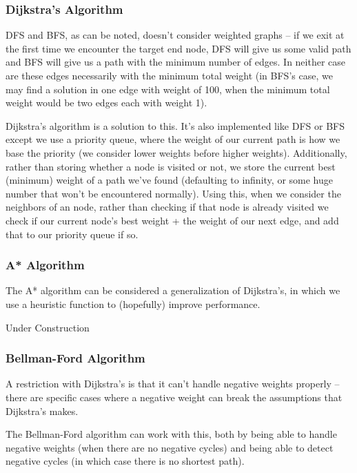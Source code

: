 \subsubsection{Dijkstra's Algorithm}

DFS and BFS, as can be noted, doesn't consider weighted graphs -- if we exit at the first time we encounter the target end node, DFS will give us some valid path and BFS will give us a path with the minimum number of edges. In neither case are these edges necessarily with the minimum total weight (in BFS's case, we may find a solution in one edge with weight of 100, when the minimum total weight would be two edges each with weight 1).

Dijkstra's algorithm is a solution to this. It's also implemented like DFS or BFS except we use a priority queue, where the weight of our current path is how we base the priority (we consider lower weights before higher weights). Additionally, rather than storing whether a node is visited or not, we store the current best (minimum) weight of a path we've found (defaulting to infinity, or some huge number that won't be encountered normally). Using this, when we consider the neighbors of an node, rather than checking if that node is already visited we check if our current node's best weight + the weight of our next edge, and add that to our priority queue if so.

\subsubsection{A* Algorithm}

The A* algorithm can be considered a generalization of Dijkstra's, in which we use a heuristic function to (hopefully) improve performance.

Under Construction

\subsubsection{Bellman-Ford Algorithm}

A restriction with Dijkstra's is that it can't handle negative weights properly -- there are specific cases where a negative weight can break the assumptions that Dijkstra's makes.

The Bellman-Ford algorithm can work with this, both by being able to handle negative weights (when there are no negative cycles) and being able to detect negative cycles (in which case there is no shortest path).

